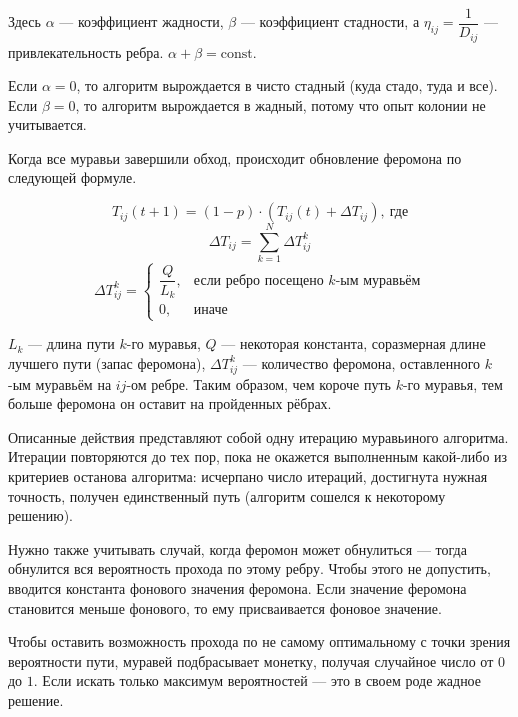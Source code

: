 Здесь $\alpha$ --- коэффициент жадности, $\beta$ --- коэффициент стадности, а $\eta_{ij} = \dfrac{1}{D_{ij}}$ --- привлекательность ребра. $\alpha + \beta = \text{const}$.

Если $\alpha = 0$, то алгоритм вырождается в чисто стадный (куда стадо, туда и все). Если $\beta = 0$, то алгоритм вырождается в жадный, потому что опыт колонии не учитывается.

Когда все муравьи завершили обход, происходит обновление фе­ромона по следующей формуле.

\begin{equation*}
	T_{ij}(t + 1) = (1 - p)\cdot(T_{ij}(t) + \Delta T_{ij}),\ \text{где}
\end{equation*}
%
\begin{equation*}
	\Delta T_{ij} = \sum\limits_{k = 1}^N \Delta T_{ij}^k
\end{equation*}
%
\begin{equation*}
	\Delta T_{ij}^k = \begin{cases}
		\dfrac{Q}{L_k}, & \text{если ребро посещено $k$-ым муравьём}\\
		0, & \text{иначе}
	\end{cases}
\end{equation*}
\vspace{5mm}

$L_k$ --- длина пути $k$-го муравья, $Q$ --- некоторая константа, соразмерная длине лучшего пути (запас феромона), $\Delta T_{ij}^k$ --- количество феромона, оставленного $k$-ым муравьём на $ij$-ом ребре. Таким образом, чем короче путь $k$-го муравья, тем больше феромона он оставит на пройденных рёбрах.

Описанные действия представляют собой одну итерацию муравьи­ного алгоритма. Итерации повторяются до тех пор, пока не окажется выполненным какой-либо из критериев останова алгоритма: исчерпа­но число итераций, достигнута нужная точность, получен единственный путь (алгоритм сошелся к некоторому решению).

Нужно также учитывать случай, когда феромон может обнулить­ся --- тогда обнулится вся вероятность прохода по этому ребру. Чтобы этого не допустить, вводится константа фонового значения феромона. Если значение феромона становится меньше фонового, то ему присваивается фоновое значение.

Чтобы оставить возможность прохода по не самому оптимальному с точки зрения вероятности пути, муравей подбрасывает монетку, по­лучая случайное число от $0$ до $1$. Если искать только максимум вероят­ностей --- это в своем роде жадное решение.

